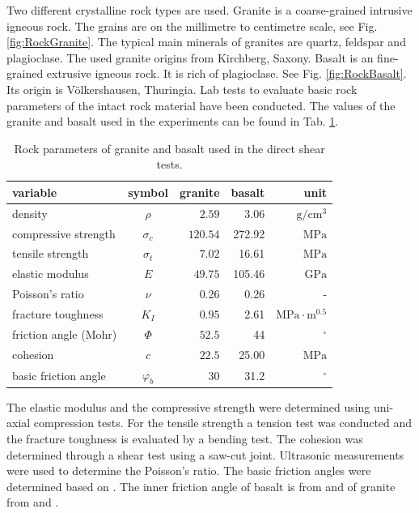 Two different crystalline rock  types are used. Granite is a coarse-grained intrusive igneous rock. The grains are on the millimetre to centimetre scale, see Fig. \ref{fig:RockGranite}. The typical main minerals of granites are quartz, feldspar and plagioclase. The used granite origins from Kirchberg, Saxony.
%
Basalt is an fine-grained extrusive igneous rock. It is rich of plagioclase. See Fig. \ref{fig:RockBasalt}. Its origin is V\"olkershausen, Thuringia.
%
Lab tests to evaluate basic rock parameters of the intact rock material have been conducted. The values of the granite and basalt used in the experiments can be found in Tab. \ref{table:MEX7_rockParam}.

\begin{table}[!ht]
\begin{center}
\begin{tabular}{l c r r r}
variable & symbol & granite & basalt & unit\\
\hline
density & $\rho$ & $2.59$ &3.06 &$\text{g}/\text{cm}^3$\\
compressive strength & $\sigma_c$ & $120.54$&272.92 &$\text{MPa}   $\\
tensile strength & $\sigma_t$ & $7.02$&16.61 &$ \text{MPa}   $\\
elastic modulus & $E$ & $49.75$&105.46 &$ \text{GPa}   $\\
Poisson's ratio & $\nu$ & 0.26 & 0.26  & -\\
fracture toughness & $K_I$ & $0.95$& 2.61 &$\text{MPa}\cdot\text{m}^{0.5}$\\
friction angle (Mohr) & $\Phi$ &  $52.5$& 44 &$^\circ$\\
cohesion & $c$ &  $22.5$& 25.00  &$ \text{MPa}   $\\
basic friction angle &$\varphi_b$ &30 & 31.2 & $^\circ$\\
\end{tabular}
\caption{Rock parameters of granite and basalt used in the direct shear tests.}
\label{table:MEX7_rockParam}
\end{center}
\end{table}

The elastic modulus and the compressive strength were determined using uni-axial compression tests. For the tensile strength a tension test was conducted and the fracture toughness is evaluated by a bending test. The cohesion was determined through a shear test using a saw-cut joint. Ultrasonic measurements were used to determine the Poisson's ratio.
%
The basic friction angles were determined based on \cite{Alejano20121023}. The inner friction angle of basalt is from \cite{Schultz19951} and of granite from \cite{Lanaro2005} and \cite{Ramana2019273}.

